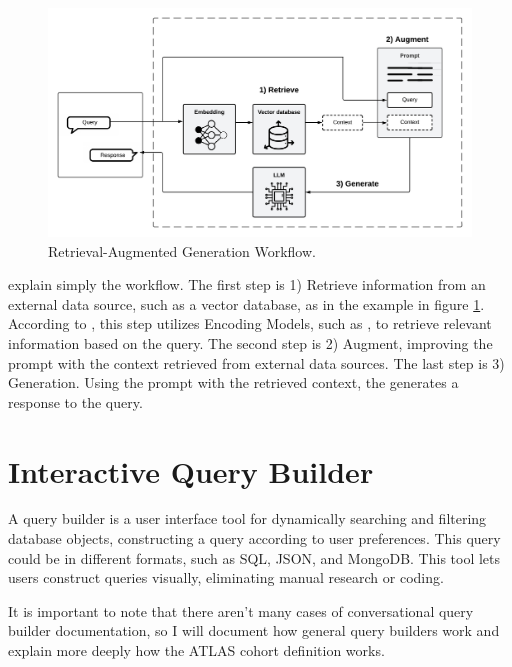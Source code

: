 \begin{figure}[ht]
    \includegraphics[width=14cm]{figs/chapter2/rag_workflow.png}
    \centering
    \caption{Retrieval-Augmented Generation Workflow.}
    \label{fig_rag}
\end{figure}

\citet{gao_retrieval-augmented_2023} explain simply the workflow. The first step is 1) Retrieve information from an external data source, such as a vector database, as in the example in figure \ref{fig_rag}. According to \citet{gao_retrieval-augmented_2023}, this step utilizes Encoding Models, such as {\bm}, to retrieve relevant information based on the query. The second step is 2) Augment, improving the {\llm} prompt with the context retrieved from external data sources. The last step is 3) Generation. Using the prompt with the retrieved context, the {\llm} generates a response to the query.




\section{Interactive Query Builder}

A query builder is a user interface tool for dynamically searching and filtering database objects, constructing a query according to user preferences. This query could be in different formats, such as SQL, JSON, and MongoDB. This tool lets users construct queries visually, eliminating manual research or coding. 

It is important to note that there aren't many cases of conversational query builder documentation, so I will document how general query builders work and explain more deeply how the ATLAS cohort definition works. 


